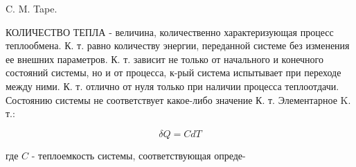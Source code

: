 \documentclass[10pt]{article}
\begin{document}
C. M. Tape.



КОЛИЧЕСТВО ТЕПЛА - величина, количественно характеризующая процесс теплообмена. К. т. равно количеству энергии, переданной системе без изменения ее внешних параметров. К. т. зависит не только от начального и конечного состояний системы, но и от процесса, к-рый система испытывает при переходе между ними. К. т. отлично от нуля только при наличии процесса теплоотдачи. Состоянию системы не соответствует какое-либо значение К. т. Элементарное K. т.:



\[

\delta Q=C d T

\]



где $C$ - теплоемкость системы, соответствующая опреде-
\end{document}
